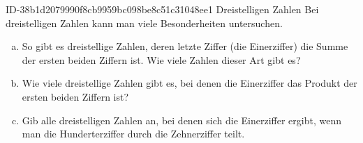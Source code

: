 \begin{exercise}
      {ID-38b1d2079990f8cb9959bc098be8c51c31048ee1}
      {Dreistelligen Zahlen}
  \ifproblem\problem
    Bei dreistelligen Zahlen kann man viele Besonderheiten untersuchen.
    \begin{enumerate}[a)]
      \item So gibt es dreistellige Zahlen, deren letzte Ziffer (die Einerziffer)
            die Summe der ersten beiden Ziffern ist. Wie viele Zahlen dieser Art
            gibt es?
      \item Wie viele dreistellige Zahlen gibt es, bei denen die Einerziffer das
            Produkt der ersten beiden Ziffern ist?
      \item Gib alle dreistelligen Zahlen an, bei denen sich die Einerziffer ergibt,
            wenn man die Hunderterziffer durch die Zehnerziffer teilt.
    \end{enumerate}
  \fi
\end{exercise}
